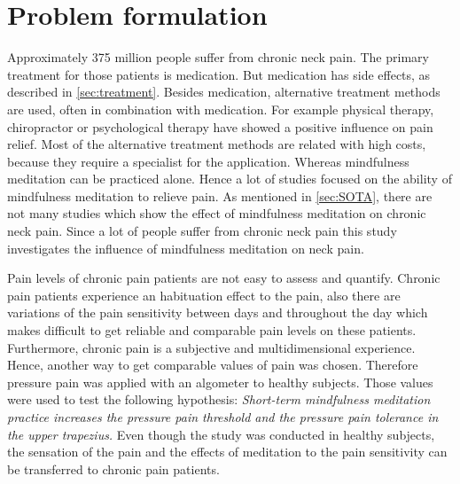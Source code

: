 \chapter{Problem formulation}

Approximately 375 million people suffer from chronic neck pain. The primary treatment for those patients is medication. But medication has side effects, as described in \ref{sec:treatment}.  Besides medication, alternative treatment methods are used, often in combination with medication. For example physical therapy, chiropractor or psychological therapy have showed a positive influence on pain relief. Most of the alternative treatment methods are related with high costs, because they require a specialist for the application. Whereas mindfulness meditation can be practiced alone. Hence a lot of studies focused on the ability of mindfulness meditation to relieve pain.
As mentioned in \ref{sec:SOTA}, there are not many studies which show the effect of mindfulness meditation on chronic neck pain. Since a lot of people suffer from chronic neck pain this study investigates the influence of mindfulness meditation on neck pain. 


Pain levels of chronic pain patients are not easy to assess and quantify. Chronic pain patients experience an habituation effect to the pain, also there are variations of the pain sensitivity between days and throughout the day which makes difficult to get reliable and comparable pain levels on these patients. Furthermore, chronic pain is a subjective and multidimensional experience.
Hence, another way to get comparable values of pain was chosen. Therefore pressure pain was applied with an algometer to healthy subjects. Those values were used to test the following hypothesis:
\textit{Short-term mindfulness meditation practice increases the pressure pain threshold and the pressure pain tolerance in the upper trapezius.}
Even though the study was conducted in healthy subjects, the sensation of the pain and the effects of meditation to the pain sensitivity can be transferred to chronic pain patients.


